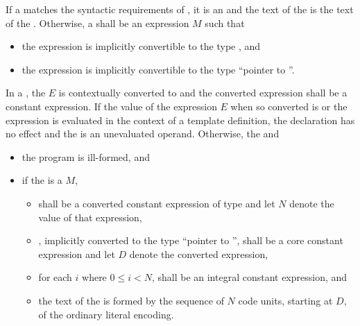 \pnum
If a 
matches the syntactic requirements of ,
it is an  and
the text of the  is
the text of the .
Otherwise, a  shall be an expression $M$
such that
\begin{itemize}
\item
the expression  is
implicitly convertible to the type , and
\item
the expression  is
implicitly convertible to the type ``pointer to ''.
\end{itemize}

\pnum
{}%
In a ,
the  $E$
is contextually converted to  and
the converted expression shall be a constant expression.
If the value of the expression $E$ when so converted is  or
the expression is evaluated in the context of a template definition,
the declaration has no effect and
the  is
an unevaluated operand.
Otherwise,
the   and
\begin{itemize}
\item
the program is ill-formed, and
\item
if the  is
a  $M$,
\begin{itemize}
\item
{} shall be a converted constant expression of
type  and
let $N$ denote the value of that expression,
\item
{}, implicitly converted to
the type ``pointer to '',
shall be a core constant expression and let $D$ denote the converted expression,
\item
for each $i$ where $0 \le i < N$,
 shall be an integral constant expression, and
\item
the text of the  is formed by
the sequence of $N$ code units, starting at $D$, of
the ordinary literal encoding.
\end{itemize}
\end{itemize}

